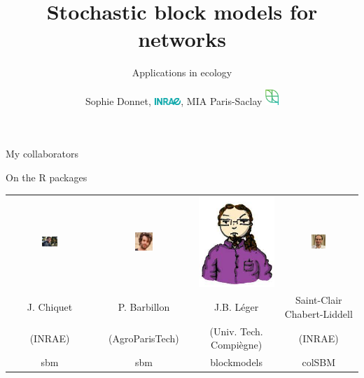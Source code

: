 \documentclass[compress,10pt]{beamer}
\title{Stochastic block models for networks}
\subtitle{Applications in ecology}
\date{}
\author{Sophie  Donnet,  \includegraphics[width= 1cm]{plots/Logo-INRAE},    MIA Paris-Saclay \includegraphics[width= 0.5cm]{plots/MIAPS}}
\institute{Aug. 2023}
\begin{document}


\begin{frame}

\titlepage


\end{frame}

 
\begin{frame}{My collaborators}


\alert{On the R packages}

\begin{tabular}{cccc}
 \includegraphics[width = 0.20\textwidth]{plots/Chiquet}& \includegraphics[width = 0.20\textwidth]{plots/Barbillon}& \includegraphics[width = 0.20\linewidth]{plots/jbleger} &\includegraphics[width = 0.20\textwidth]{plots/saintclair}\\
 \scriptsize J. Chiquet  & \scriptsize P. Barbillon & \scriptsize J.B. Léger & \scriptsize Saint-Clair Chabert-Liddell \\
 \scriptsize (INRAE) & \scriptsize (AgroParisTech) & \scriptsize (Univ. Tech. Compiègne)& \scriptsize (INRAE)\\
 \hline 
 \scriptsize \textsf{sbm}& \scriptsize \textsf{sbm} & \scriptsize \textsf{blockmodels} & \scriptsize  \textsf{colSBM} 
\end{tabular}


\end{frame}
\end{document}
